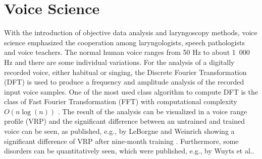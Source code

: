 %

\section{Voice Science}
\label{sec:voice}
With the introduction of objective data analysis and laryngoscopy methods, voice science emphasized the cooperation among laryngologists, speech pathologists and voice teachers.
The normal human voice ranges from 50 Hz to about 1~000 Hz and there are some  individual variations. For the analysis of a digitally recorded voice, either habitual or singing, the Discrete Fourier Transformation (DFT) is used to produce a frequency and amplitude analysis of the recorded input voice samples. One of the most used class algorithm to compute DFT is the class of Fast Fourier Transformation (FFT) with computational complexity $O(n \log(n))$ \cite{Cooley1965,Frigo2005}.
The result of the analysis can be visualized in a voice range profile (VRP) and the significant difference between an untrained and trained voice can be seen, as published, e.g., by LeBorgne and Weinrich showing a significant difference of VRP after nine-month training \cite{DeLeoLeBorgne2002}. Furthermore, some disorders can be quantitatively seen, which were published, e.g., by Wuyts et al.\cite{wuyts2003effects}.

